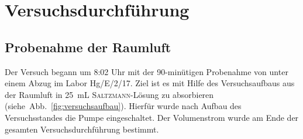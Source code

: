 \section{Versuchsdurchführung}
\label{sec:durchfuerung}

\subsection*{Probenahme der Raumluft}
Der Versuch begann um 8:02 Uhr mit der 90-minütigen Probenahme von  unter einem Abzug im Labor Hg/E/2/17. 
Ziel ist es mit Hilfe des Versuchsaufbaus  aus der Raumluft in \SI{25}{\milli \liter} \textsc{Saltzmann}-Lösung zu absorbieren \mbox{(siehe Abb. \ref{fig:versuchsaufbau})}.
Hierfür wurde nach Aufbau des Versuchsstandes die Pumpe eingeschaltet. Der Volumenstrom wurde am Ende der gesamten Versuchsdurchführung bestimmt.


